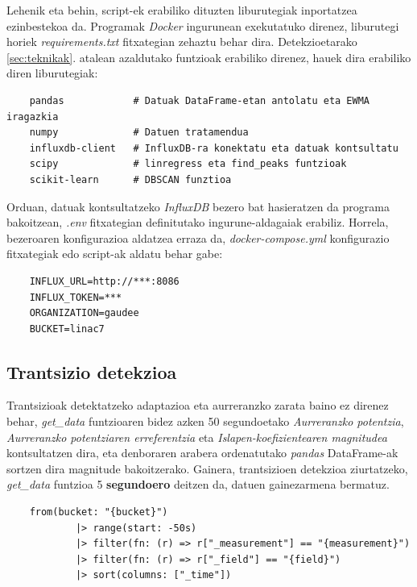 \documentclass[12pt]{article}
\numberwithin{figure}{section}
\numberwithin{equation}{section}
\begin{document}
Lehenik eta behin, script-ek erabiliko dituzten liburutegiak inportatzea ezinbestekoa da. Programak \textit{Docker} ingurunean exekutatuko direnez, liburutegi horiek \textit{requirements.txt} fitxategian zehaztu behar dira. Detekzioetarako \ref{sec:teknikak}. atalean azaldutako funtzioak erabiliko direnez, hauek dira erabiliko diren liburutegiak:\\

\begin{verbatim}
    pandas            # Datuak DataFrame-etan antolatu eta EWMA iragazkia
    numpy             # Datuen tratamendua
    influxdb-client   # InfluxDB-ra konektatu eta datuak kontsultatu
    scipy             # linregress eta find_peaks funtzioak
    scikit-learn      # DBSCAN funztioa
\end{verbatim}

Orduan, datuak kontsultatzeko \textit{InfluxDB} bezero bat hasieratzen da programa bakoitzean, \textit{.env} fitxategian definitutako ingurune-aldagaiak erabiliz. Horrela, bezeroaren konfigurazioa aldatzea erraza da, \textit{docker-compose.yml} konfigurazio fitxategiak edo script-ak aldatu behar gabe:\\

\begin{verbatim}
    INFLUX_URL=http://***:8086
    INFLUX_TOKEN=***
    ORGANIZATION=gaudee
    BUCKET=linac7
\end{verbatim}

\subsection{Trantsizio detekzioa}

Trantsizioak detektatzeko adaptazioa eta aurreranzko zarata baino ez direnez behar, \textit{get\_data} funtzioaren bidez azken 50 segundoetako \textit{Aurreranzko potentzia}, \textit{Aurreranzko potentziaren erreferentzia} eta \textit{Islapen-koefizientearen magnitudea} kontsultatzen dira, eta denboraren arabera ordenatutako \textit{pandas} DataFrame-ak sortzen dira magnitude bakoitzerako. Gainera, trantsizioen detekzioa ziurtatzeko, \textit{get\_data} funtzioa 5 \textbf{segundoero} deitzen da, datuen gainezarmena bermatuz.

\begin{verbatim}
    from(bucket: "{bucket}")
            |> range(start: -50s)
            |> filter(fn: (r) => r["_measurement"] == "{measurement}")
            |> filter(fn: (r) => r["_field"] == "{field}")
            |> sort(columns: ["_time"])
\end{verbatim}
\end{document}
